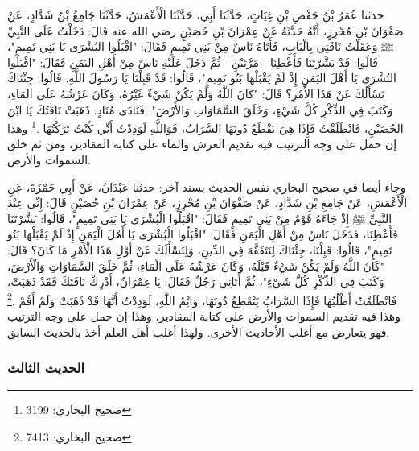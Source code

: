 حدثنا عُمَرُ بْنُ حَفْصِ بْنِ غِيَاثٍ، حَدَّثَنَا أَبِي، حَدَّثَنَا الْأَعْمَشُ، حَدَّثَنَا جَامِعُ بْنُ شَدَّادٍ، عَنْ صَفْوَانَ بْنِ مُحْرِزٍ، أَنَّهُ حَدَّثَهُ عَنْ عِمْرَانَ بْنِ حُصَيْنٍ رضي الله عنه قَالَ: دَخَلْتُ عَلَى النَّبِيِّ ﷺ وَعَقَلْتُ نَاقَتِي بِالْبَابِ، فَأَتَاهُ نَاسٌ مِنْ بَنِي تَمِيمٍ فَقَالَ: "اقْبَلُوا البُشْرَى يَا بَنِي تَمِيمٍ"، قَالُوا: قَدْ بَشَّرْتَنَا فَأَعْطِنَا - مَرَّتَيْنِ - ثُمَّ دَخَلَ عَلَيْهِ نَاسٌ مِنْ أَهْلِ اليَمَنِ فَقَالَ: "اقْبَلُوا البُشْرَى يَا أَهْلَ اليَمَنِ إِذْ لَمْ يَقْبَلْهَا بَنُو تَمِيمٍ"، قَالُوا: قَدْ قَبِلْنَا يَا رَسُولَ اللَّهِ. قَالُوا: جِئْنَاكَ نَسْأَلُكَ عَنْ هَذَا الأَمْرِ؟ قَالَ: "كَانَ اللَّهُ وَلَمْ يَكُنْ شَيْءٌ غَيْرُهُ، وَكَانَ عَرْشُهُ عَلَى المَاءِ، وَكَتَبَ فِي الذِّكْرِ كُلَّ شَيْءٍ، وَخَلَقَ السَّمَاوَاتِ وَالأَرْضَ". فَنَادَى مُنَادٍ: ذَهَبَتْ نَاقَتُكَ يَا ابْنَ الحُصَيْنِ، فَانْطَلَقْتُ فَإِذَا هِيَ يَقْطَعُ دُونَهَا السَّرَابُ، فَوَاللَّهِ لَوَدِدْتُ أَنِّي كُنْتُ تَرَكْتُهَا \href{https://shamela.ws/book/1284/2020#p2}{\faExternalLink} \cite{bukhari}.\footnote{صحيح البخاري: 3199} وهذا إن حمل على وجه الترتيب فيه تقديم العرش والماء على كتابة المقادير، ومن ثم خلق السموات والأرض.

وجاء أيضا في صحيح البخاري نفس الحديث بسند آخر:
حدثنا عَبْدَانُ، عَنْ أَبِي حَمْزَةَ، عَنِ الْأَعْمَشِ، عَنْ جَامِعِ بْنِ شَدَّادٍ، عَنْ صَفْوَانَ بْنِ مُحْرِزٍ، عَنْ عِمْرَانَ بْنِ حُصَيْنٍ قَالَ: إِنِّي عِنْدَ النَّبِيِّ ﷺ إِذْ جَاءَهُ قَوْمٌ مِنْ بَنِي تَمِيمٍ فَقَالَ: "اقْبَلُوا الْبُشْرَى يَا بَنِي تَمِيمٍ"، قَالُوا: بَشَّرْتَنَا فَأَعْطِنَا، فَدَخَلَ نَاسٌ مِنْ أَهْلِ الْيَمَنِ فَقَالَ: "اقْبَلُوا الْبُشْرَى يَا أَهْلَ الْيَمَنِ إِذْ لَمْ يَقْبَلْهَا بَنُو تَمِيمٍ"، قَالُوا: قَبِلْنَا، جِئْنَاكَ لِنَتَفَقَّهَ فِي الدِّينِ، وَلِنَسْأَلَكَ عَنْ أَوَّلِ هَذَا الْأَمْرِ مَا كَانَ؟ قَالَ: "كَانَ اللَّهُ وَلَمْ يَكُنْ شَيْءٌ قَبْلَهُ، وَكَانَ عَرْشُهُ عَلَى الْمَاءِ، ثُمَّ خَلَقَ السَّمَاوَاتِ وَالْأَرْضَ، وَكَتَبَ فِي الذِّكْرِ كُلَّ شَيْءٍ"، ثُمَّ أَتَانِي رَجُلٌ فَقَالَ: يَا عِمْرَانُ، أَدْرِكْ نَاقَتَكَ فَقَدْ ذَهَبَتْ، فَانْطَلَقْتُ أَطْلُبُهَا فَإِذَا السَّرَابُ يَنْقَطِعُ دُونَهَا، وَايْمُ اللَّهِ، لَوَدِدْتُ أَنَّهَا قَدْ ذَهَبَتْ وَلَمْ أَقُمْ \href{https://shamela.ws/book/1284/4624#p6}{\faExternalLink} \cite{bukhari}.\footnote{صحيح البخاري: 7413} وهذا فيه تقديم السموات والأرض على كتابة المقادير، وهذا إن حمل على وجه الترتيب فهو يتعارض مع أغلب الأحاديث الأخرى. ولهذا أغلب أهل العلم أخذ بالحديث السابق. 

\subsubsection{الحديث الثالث}
\label{sec:app_first_creation_hadith_3}

